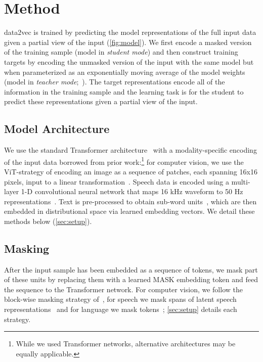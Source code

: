 \documentclass[nohyperref]{article}
\theoremstyle{plain}
\theoremstyle{definition}
\theoremstyle{remark}
\newcommand{\name}{data2vec}
\begin{document}
\section{Method}

\name{} is trained by predicting the model representations of the full input data given a partial view of the input (\autoref{fig:model}).
We first encode a masked version of the training sample (model in \emph{student mode}) and then construct training targets by encoding the unmasked version of the input with the same model but when parameterized as an exponentially moving average of the model weights (model in \emph{teacher mode};~\citealt{grill2020byol,caron2021dino}).
The target representations encode all of the information in the training sample and the learning task is for the student to predict these representations given a partial view of the input.


\subsection{Model Architecture}

We use the standard Transformer architecture~\citep{vaswani2017transformer} with a modality-specific encoding of the input data borrowed from prior work:\footnote{While we used Transformer networks, alternative architectures may be equally applicable.}
for computer vision, we use the ViT-strategy of encoding an image as a sequence of patches, each spanning 16x16 pixels, input to a linear transformation~\citep{dosovitskiy2020vit,bao2021beit}.
Speech data is encoded using a multi-layer 1-D convolutional neural network that maps 16 kHz waveform to 50 Hz representations~\citep{baevski2020wav}.
Text is pre-processed to obtain sub-word units~\citep{sennrich2016bpe,devlin2018bert}, which are then embedded in distributional space via learned embedding vectors.
We detail these methods below (\textsection\ref{sec:setup}).


\subsection{Masking}

After the input sample has been embedded as a sequence of tokens, we mask part of these units by replacing them with a learned MASK embedding token and feed the sequence to the Transformer network.
For computer vision, we follow the block-wise masking strategy of~\citet{bao2021beit}, for speech we mask spans of latent speech representations~\citep{baevski2020wav} and for language we mask tokens~\citep{devlin2018bert}; \textsection\ref{sec:setup} details each strategy.
\end{document}
